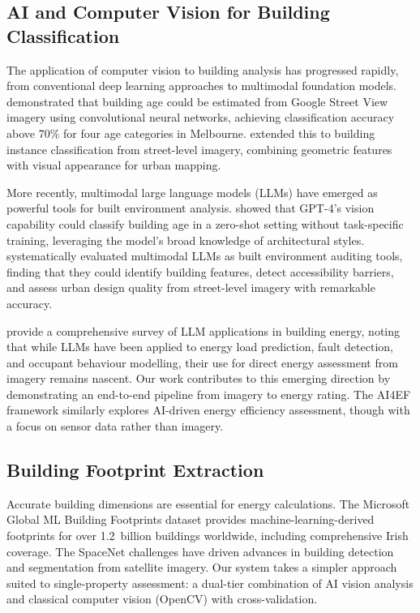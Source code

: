 \documentclass[preprint,12pt,authoryear]{elsarticle}
\begin{document}
\subsection{AI and Computer Vision for Building Classification}

The application of computer vision to building analysis has progressed rapidly, from conventional deep learning approaches to multimodal foundation models. \citet{li2018_building_age} demonstrated that building age could be estimated from Google Street View imagery using convolutional neural networks, achieving classification accuracy above 70\% for four age categories in Melbourne. \citet{kang2018_building_classification} extended this to building instance classification from street-level imagery, combining geometric features with visual appearance for urban mapping.

More recently, multimodal large language models (LLMs) have emerged as powerful tools for built environment analysis. \citet{zeroshot_building_age_2024} showed that GPT-4's vision capability could classify building age in a zero-shot setting without task-specific training, leveraging the model's broad knowledge of architectural styles. \citet{llm_built_environment_2025} systematically evaluated multimodal LLMs as built environment auditing tools, finding that they could identify building features, detect accessibility barriers, and assess urban design quality from street-level imagery with remarkable accuracy.

\citet{llm_building_energy_survey_2025} provide a comprehensive survey of LLM applications in building energy, noting that while LLMs have been applied to energy load prediction, fault detection, and occupant behaviour modelling, their use for direct energy assessment from imagery remains nascent. Our work contributes to this emerging direction by demonstrating an end-to-end pipeline from imagery to energy rating. The AI4EF framework \citep{ai4ef_2025} similarly explores AI-driven energy efficiency assessment, though with a focus on sensor data rather than imagery.

\subsection{Building Footprint Extraction}

Accurate building dimensions are essential for energy calculations. The Microsoft Global ML Building Footprints dataset \citep{microsoft_buildings_2023} provides machine-learning-derived footprints for over 1.2~billion buildings worldwide, including comprehensive Irish coverage. The SpaceNet challenges \citep{spacenet_2018} have driven advances in building detection and segmentation from satellite imagery. Our system takes a simpler approach suited to single-property assessment: a dual-tier combination of AI vision analysis and classical computer vision (OpenCV) with cross-validation.
\end{document}

